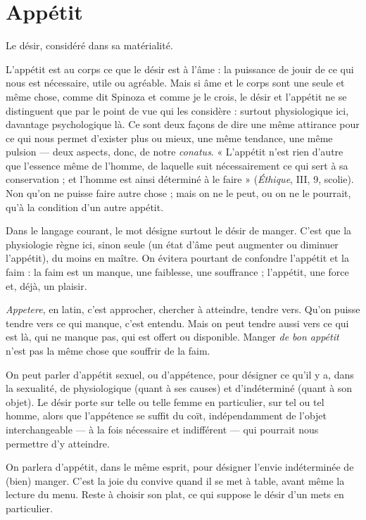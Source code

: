 \section{Appétit}
Le désir, considéré dans sa matérialité.

L’appétit est au corps ce que le désir est à l’âme : la puissance de
jouir de ce qui nous est nécessaire, utile ou agréable. Mais si âme et le corps
sont une seule et même chose, comme dit Spinoza et comme je le crois, le désir
et l'appétit ne se distinguent que par le point de vue qui les considère : surtout
physiologique ici, davantage psychologique là. Ce sont deux façons de dire une
même attirance pour ce qui nous permet d’exister plus ou mieux, une même
tendance, une même pulsion — deux aspects, donc, de notre {\it conatus}. « L’appétit
n’est rien d’autre que l’essence même de l’homme, de laquelle suit nécessairement
ce qui sert à sa conservation ; et l’homme est ainsi déterminé à le faire »
({\it Éthique}, III, 9, scolie). Non qu’on ne puisse faire autre chose ; mais on ne le
peut, ou on ne le pourrait, qu’à la condition d’un autre appétit.

Dans le langage courant, le mot désigne surtout le désir de manger. C’est
que la physiologie règne ici, sinon seule (un état d’âme peut augmenter ou
diminuer l’appétit), du moins en maître. On évitera pourtant de confondre
l'appétit et la faim : la faim est un manque, une faiblesse, une souffrance ;
l'appétit, une force et, déjà, un plaisir.

{\it Appetere}, en latin, c’est approcher, chercher à atteindre, tendre vers. Qu’on
puisse tendre vers ce qui manque, c’est entendu. Mais on peut tendre aussi vers
ce qui est là, qui ne manque pas, qui est offert ou disponible. Manger {\it de bon
appétit} n’est pas la même chose que souffrir de la faim.

On peut parler d’appétit sexuel, ou d’appétence, pour désigner ce qu’il y a,
dans la sexualité, de physiologique (quant à ses causes) et d’indéterminé (quant
à son objet). Le désir porte sur telle ou telle femme en particulier, sur tel ou tel
homme, alors que l’appétence se suffit du coït, indépendamment de l’objet
interchangeable — à la fois nécessaire et indifférent — qui pourrait nous permettre
d’y atteindre.

On parlera d’appétit, dans le même esprit, pour désigner l’envie indéterminée
de (bien) manger. C’est la joie du convive quand il se met à table, avant
même la lecture du menu. Reste à choisir son plat, ce qui suppose le désir d’un
mets en particulier.

